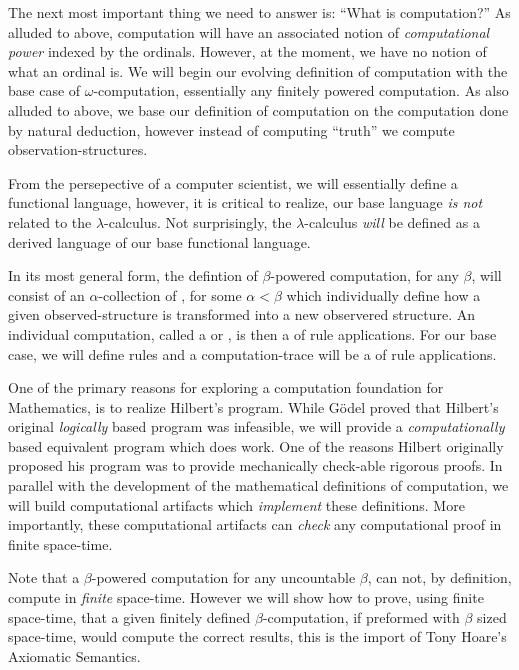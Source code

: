 The next most important thing we need to answer is: ``What is computation?'' As
alluded to above, computation will have an associated notion of
\emph{computational power} indexed by the ordinals. However, at the moment, we
have no notion of what an ordinal is. We will begin our evolving definition of
computation with the base case of $\omega$-computation, essentially any finitely
powered computation. As also alluded to above, we base our definition of
computation on the computation done by natural deduction, however instead of
computing ``truth'' we compute observation-structures.

From the persepective of a computer scientist, we will essentially define a
functional language, however, it is critical to realize, our base language
\emph{is not} related to the $\lambda$-calculus. Not surprisingly, the
$\lambda$-calculus \emph{will} be defined as a derived language of our base
functional language.

In its most general form, the defintion of $\beta$-powered computation, for any
$\beta$, will consist of an $\alpha$-collection of , for some
$\alpha < \beta$ which individually define how a given observed-structure is
transformed into a new observered structure. An individual computation, called a
 or , is then a
 of rule applications. For our base case, we will define
 rules and a computation-trace will be a  of
rule applications.

One of the primary reasons for exploring a computation foundation for
Mathematics, is to realize Hilbert's program. While G\"odel proved that
Hilbert's original \emph{logically} based program was infeasible, we will
provide a \emph{computationally} based equivalent program which does work. One
of the reasons Hilbert originally proposed his program was to provide
mechanically check-able rigorous proofs. In parallel with the development of the
mathematical definitions of computation, we will build computational artifacts
which \emph{implement} these definitions. More importantly, these computational
artifacts can \emph{check} any computational proof in finite space-time.

Note that a $\beta$-powered computation for any uncountable $\beta$, can not, by
definition, compute in \emph{finite} space-time. However we will show how to
prove, using finite space-time, that a given finitely defined
$\beta$-computation, if preformed with $\beta$ sized space-time, would compute
the correct results, this is the import of Tony Hoare's Axiomatic Semantics.


